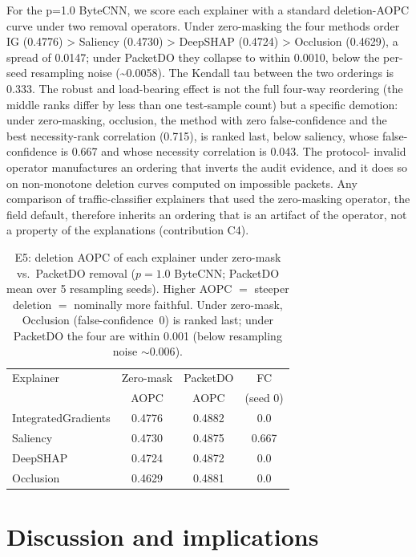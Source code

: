 \documentclass[journal]{IEEEtran}
\begin{document}
For the p=1.0 ByteCNN, we score each explainer with a standard
deletion-AOPC curve under two removal operators. Under zero-masking the
four methods order IG (0.4776) \textgreater{} Saliency (0.4730)
\textgreater{} DeepSHAP (0.4724) \textgreater{} Occlusion (0.4629), a
spread of 0.0147; under PacketDO they collapse to within 0.0010, below
the per-seed resampling noise (\textasciitilde0.0058). The Kendall tau
between the two orderings is 0.333. The robust and load-bearing effect
is not the full four-way reordering (the middle ranks differ by less
than one test-sample count) but a specific demotion: under zero-masking,
occlusion, the method with zero false-confidence and the best
necessity-rank correlation (0.715), is ranked last, below saliency,
whose false-confidence is 0.667 and whose necessity correlation is
0.043. The protocol- invalid operator manufactures an ordering that
inverts the audit evidence, and it does so on non-monotone deletion
curves computed on impossible packets. Any comparison of
traffic-classifier explainers that used the zero-masking operator, the
field default, therefore inherits an ordering that is an artifact of the
operator, not a property of the explanations (contribution C4).

\begin{table}[!t]
\centering
\caption{E5: deletion AOPC of each explainer under zero-mask vs.\ PacketDO removal ($p{=}1.0$ ByteCNN; PacketDO mean over 5 resampling seeds). Higher AOPC $=$ steeper deletion $=$ nominally more faithful. Under zero-mask, Occlusion (false-confidence~0) is ranked last; under PacketDO the four are within 0.001 (below resampling noise ${\sim}0.006$).}
\label{tab:e5}
\small
\setlength{\tabcolsep}{4pt}
\begin{tabular}{@{}lccc@{}}
\toprule
Explainer & Zero-mask & PacketDO & FC \\
          & AOPC      & AOPC     & (seed 0) \\
\midrule
IntegratedGradients & 0.4776 & 0.4882 & 0.0 \\
Saliency & 0.4730 & 0.4875 & 0.667 \\
DeepSHAP & 0.4724 & 0.4872 & 0.0 \\
Occlusion & 0.4629 & 0.4881 & 0.0 \\
\bottomrule
\end{tabular}
\end{table}

\section{Discussion and implications}
\end{document}
